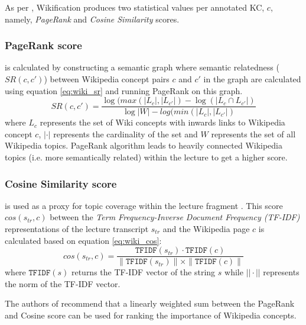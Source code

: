 \documentclass[letterpaper]{article} %
\begin{document}
As per \cite{wikifier}, Wikification produces two statistical values per annotated KC, $c$, namely, \emph{PageRank} and \emph{Cosine Similarity} scores. 

\subsubsection{PageRank score} 

is calculated by constructing a semantic graph where semantic relatedness ($SR(c,c')$) between Wikipedia concept pairs $c$ and $c'$ in the graph are calculated using equation \ref{eq:wiki_sr} and running PageRank on this graph.
\begin{equation}\label{eq:wiki_sr}
        SR(c,c') = \frac{\log(max(|L_c|, |L_{c'}|) - \log(|L_c \cap L_{c'}|)}
        {\log |W| - log (min(|L_c|, |L_{c'}|)}
\end{equation}
where $L_{c}$ represents the set of Wiki concepts with inwards links to Wikipedia concept $c$, $|\cdot|$ represents the cardinality of the set and $W$ represents the set of all Wikipedia topics.
PageRank algorithm\cite{pagerank} leads to heavily connected Wikipedia topics (i.e. more semantically related) within the lecture to get a higher score.

\subsubsection{Cosine Similarity score} 
is used as a proxy for topic coverage within the lecture fragment \cite{truelearn}. This score $cos(s_{tr}, c)$ between the \emph{Term Frequency-Inverse Document Frequency (TF-IDF)} representations of the lecture transcript $s_{tr}$ and the Wikipedia page $c$ is calculated based on equation \ref{eq:wiki_cos}:
\begin{equation}\label{eq:wiki_cos}
        cos(s_{tr}, c) = \frac{\texttt{TFIDF}(s_{tr}) \cdot \texttt{TFIDF}(c)}
        {\|\texttt{TFIDF}(s_{tr})\| \times \|\texttt{TFIDF}(c)\|}
\end{equation}
where $\texttt{TFIDF}(s)$ returns the TF-IDF vector of the string $s$ while $||\cdot||$ represents the norm of the TF-IDF vector.

The authors of \cite{wikifier} recommend that a linearly weighted sum between the PageRank and Cosine score can be used for ranking the importance of Wikipedia concepts.

\end{document}
